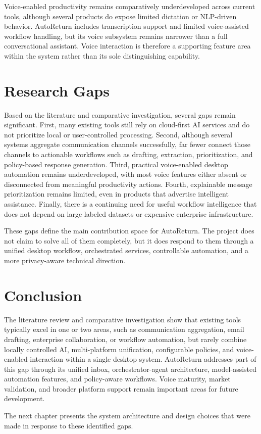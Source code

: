 Voice-enabled productivity remains comparatively underdeveloped across current tools, although several products do expose limited dictation or NLP-driven behavior. AutoReturn includes transcription support and limited voice-assisted workflow handling, but its voice subsystem remains narrower than a full conversational assistant. Voice interaction is therefore a supporting feature area within the system rather than its sole distinguishing capability.

\section{Research Gaps}
Based on the literature and comparative investigation, several gaps remain significant. First, many existing tools still rely on cloud-first AI services and do not prioritize local or user-controlled processing. Second, although several systems aggregate communication channels successfully, far fewer connect those channels to actionable workflows such as drafting, extraction, prioritization, and policy-based response generation. Third, practical voice-enabled desktop automation remains underdeveloped, with most voice features either absent or disconnected from meaningful productivity actions. Fourth, explainable message prioritization remains limited, even in products that advertise intelligent assistance. Finally, there is a continuing need for useful workflow intelligence that does not depend on large labeled datasets or expensive enterprise infrastructure.

These gaps define the main contribution space for AutoReturn. The project does not claim to solve all of them completely, but it does respond to them through a unified desktop workflow, orchestrated services, controllable automation, and a more privacy-aware technical direction.

\section{Conclusion}
The literature review and comparative investigation show that existing tools typically excel in one or two areas, such as communication aggregation, email drafting, enterprise collaboration, or workflow automation, but rarely combine locally controlled AI, multi-platform unification, configurable policies, and voice-enabled interaction within a single desktop system. AutoReturn addresses part of this gap through its unified inbox, orchestrator-agent architecture, model-assisted automation features, and policy-aware workflows. Voice maturity, market validation, and broader platform support remain important areas for future development.

The next chapter presents the system architecture and design choices that were made in response to these identified gaps.
